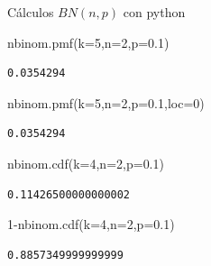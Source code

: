 \documentclass[
  ignorenonframetext,
  aspectratio=169]{beamer}
\newenvironment{Shaded}{\begin{snugshade}}{\end{snugshade}}
\newcommand{\DecValTok}[1]{\textcolor[rgb]{0.68,0.00,0.00}{#1}}
\newcommand{\FloatTok}[1]{\textcolor[rgb]{0.68,0.00,0.00}{#1}}
\newcommand{\NormalTok}[1]{\textcolor[rgb]{0.00,0.23,0.31}{#1}}
\newcommand{\OperatorTok}[1]{\textcolor[rgb]{0.37,0.37,0.37}{#1}}
\begin{document}
\begin{frame}[fragile]{Cálculos \(BN(n,p)\) con python}
\protect\hypertarget{cuxe1lculos-bnnp-con-python}{}
\begin{Shaded}
\begin{Highlighting}[]
\NormalTok{nbinom.pmf(k}\OperatorTok{=}\DecValTok{5}\NormalTok{,n}\OperatorTok{=}\DecValTok{2}\NormalTok{,p}\OperatorTok{=}\FloatTok{0.1}\NormalTok{)}
\end{Highlighting}
\end{Shaded}

\begin{verbatim}
0.0354294
\end{verbatim}

\begin{Shaded}
\begin{Highlighting}[]
\NormalTok{nbinom.pmf(k}\OperatorTok{=}\DecValTok{5}\NormalTok{,n}\OperatorTok{=}\DecValTok{2}\NormalTok{,p}\OperatorTok{=}\FloatTok{0.1}\NormalTok{,loc}\OperatorTok{=}\DecValTok{0}\NormalTok{)}
\end{Highlighting}
\end{Shaded}

\begin{verbatim}
0.0354294
\end{verbatim}

\begin{Shaded}
\begin{Highlighting}[]
\NormalTok{nbinom.cdf(k}\OperatorTok{=}\DecValTok{4}\NormalTok{,n}\OperatorTok{=}\DecValTok{2}\NormalTok{,p}\OperatorTok{=}\FloatTok{0.1}\NormalTok{)}
\end{Highlighting}
\end{Shaded}

\begin{verbatim}
0.11426500000000002
\end{verbatim}

\begin{Shaded}
\begin{Highlighting}[]
\DecValTok{1}\OperatorTok{{-}}\NormalTok{nbinom.cdf(k}\OperatorTok{=}\DecValTok{4}\NormalTok{,n}\OperatorTok{=}\DecValTok{2}\NormalTok{,p}\OperatorTok{=}\FloatTok{0.1}\NormalTok{)}
\end{Highlighting}
\end{Shaded}

\begin{verbatim}
0.8857349999999999
\end{verbatim}
\end{frame}
\end{document}
